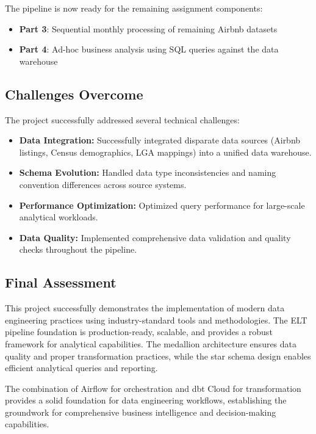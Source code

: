 The pipeline is now ready for the remaining assignment components:

\begin{itemize}
  \item \textbf{Part 3}: Sequential monthly processing of remaining Airbnb datasets
  \item \textbf{Part 4}: Ad-hoc business analysis using SQL queries against the data warehouse
\end{itemize}

\subsection{Challenges Overcome}

The project successfully addressed several technical challenges:

\begin{itemize}
  \item \textbf{Data Integration:} Successfully integrated disparate data sources (Airbnb listings, Census demographics, LGA mappings) into a unified data warehouse.
  
  \item \textbf{Schema Evolution:} Handled data type inconsistencies and naming convention differences across source systems.
  
  \item \textbf{Performance Optimization:} Optimized query performance for large-scale analytical workloads.
  
  \item \textbf{Data Quality:} Implemented comprehensive data validation and quality checks throughout the pipeline.
\end{itemize}

\subsection{Final Assessment}

This project successfully demonstrates the implementation of modern data engineering practices using industry-standard tools and methodologies. The ELT pipeline foundation is production-ready, scalable, and provides a robust framework for analytical capabilities. The medallion architecture ensures data quality and proper transformation practices, while the star schema design enables efficient analytical queries and reporting.

The combination of Airflow for orchestration and dbt Cloud for transformation provides a solid foundation for data engineering workflows, establishing the groundwork for comprehensive business intelligence and decision-making capabilities.
